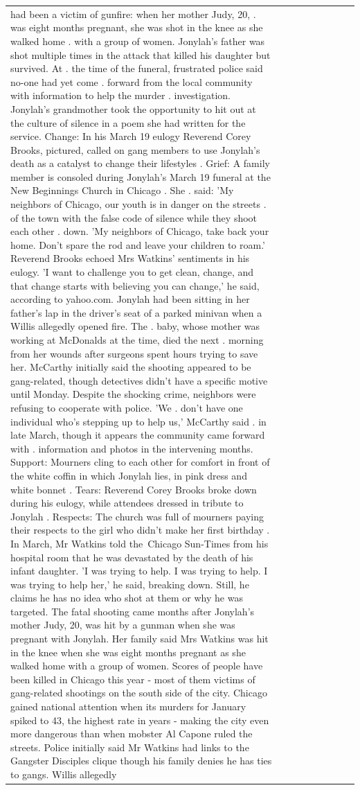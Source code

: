 \begin{table}[H]
\begin{tabular}{lllrlllll}
had been a victim of gunfire: when her mother Judy, 20, . was eight months pregnant, she was shot in the knee as she walked home . with a group of women. Jonylah's father was shot multiple times in the attack that killed his daughter but survived. At . the time of the funeral, frustrated police said no-one had yet come . forward from the local community with information to help the murder . investigation. Jonylah's grandmother took the opportunity to hit out at the culture of silence in a poem she had written for the service. Change: In his March 19 eulogy Reverend Corey Brooks, pictured, called on gang members to use Jonylah's death as a catalyst to change their lifestyles . Grief: A family member is consoled during Jonylah's March 19 funeral at the New Beginnings Church in Chicago . She . said: 'My neighbors of Chicago, our youth is in danger on the streets . of the town with the false code of silence while they shoot each other . down. 'My neighbors of Chicago, take back your home. Don't spare the rod and leave your children to roam.' Reverend Brooks echoed Mrs Watkins' sentiments in his eulogy. 'I want to challenge you to get clean, change, and that change starts with believing you can change,' he said, according to yahoo.com. Jonylah had been sitting in her father's lap in the driver's seat of a parked minivan when a Willis allegedly opened fire. The . baby, whose mother was working at McDonalds at the time, died the next . morning from her wounds after surgeons spent hours trying to save her. McCarthy initially said the shooting appeared to be gang-related, though detectives didn't have a specific motive until Monday. Despite the shocking crime, neighbors were refusing to cooperate with police. 'We . don't have one individual who's stepping up to help us,' McCarthy said . in late March, though it appears the community came forward with . information and photos in the intervening months. Support: Mourners cling to each other for comfort in front of the white coffin in which Jonylah lies, in pink dress and white bonnet . Tears: Reverend Corey Brooks broke down during his eulogy, while attendees dressed in tribute to Jonylah . Respects: The church was full of mourners paying their respects to the girl who didn't make her first birthday . In March, Mr Watkins told the Chicago Sun-Times from his hospital room that he was devastated by the death of his infant daughter. 'I was trying to help. I was trying to help. I was trying to help her,' he said, breaking down. Still, he claims he has no idea who shot at them or why he was targeted. The fatal shooting came months after Jonylah's mother Judy, 20, was hit by a gunman when she was pregnant with Jonylah. Her family said Mrs Watkins was hit in the knee when she was eight months pregnant as she walked home with a group of women. Scores of people have been killed in Chicago this year - most of them victims of gang-related shootings on the south side of the city. Chicago gained national attention when its murders for January spiked to 43, the highest rate in years - making the city even more dangerous than when mobster Al Capone ruled the streets. Police initially said Mr Watkins had links to the Gangster Disciples clique though his family denies he has ties to gangs. Willis allegedly 
\end{tabular}
\end{table}
